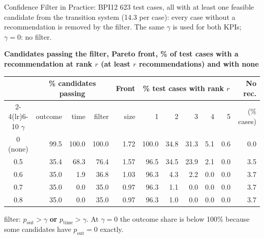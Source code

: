 \documentclass[aspectratio=169]{beamer} %
\begin{document}
\begin{frame}{Confidence Filter in Practice: BPI12}
  \small
  623 test cases, \alert{all} with at least one feasible candidate from the transition system
  (14.3 per case): every case without a recommendation is removed by the filter. The same $\gamma$ is used for
  both KPIs; $\gamma = 0$: no filter.

  \textbf{Candidates passing the filter, Pareto front, \% of test cases with a recommendation at rank $r$ (at least $r$ recommendations) and with none}
  \begin{center}\setlength{\tabcolsep}{4pt}\setlength{\aboverulesep}{0pt}\setlength{\belowrulesep}{1pt}
  \begin{tabular}{crrrrrrrrrr}
    \toprule
     & \multicolumn{3}{c}{\% candidates passing} & Front & \multicolumn{5}{c}{\% test cases with rank $r$} & No rec. \\
    \cmidrule(lr){2-4}\cmidrule(lr){6-10}
    $\gamma$ & outcome & time & filter & size & 1 & 2 & 3 & 4 & 5 & (\% cases) \\
    \midrule
    0 (none) & 99.5  & 100.0 & 100.0 & 1.72 & 100.0 & 34.8 & 31.3 & 5.1 & 0.6 & 0.0 \\
    0.5      & 35.4  & 68.3  & 76.4  & 1.57 & 96.5  & 34.5 & 23.9 & 2.1 & 0.0 & 3.5 \\
    0.6      & 35.0  & 1.9   & 36.8  & 1.03 & 96.3  & 4.3  & 2.2  & 0.0 & 0.0 & 3.7 \\
    0.7      & 35.0  & 0.0   & 35.0  & 0.97 & 96.3  & 1.1  & 0.0  & 0.0 & 0.0 & 3.7 \\
    0.8      & 35.0  & 0.0   & 35.0  & 0.97 & 96.3  & 1.0  & 0.0  & 0.0 & 0.0 & 3.7 \\
    \bottomrule
  \end{tabular}
  \end{center}
  {\scriptsize filter: $p_{\text{out}} > \gamma$ \textbf{or} $p_{\text{time}} > \gamma$. At $\gamma = 0$ the outcome
  share is below 100\% because some candidates have $p_{\text{out}} = 0$ exactly.}
\end{frame}
\end{document}
